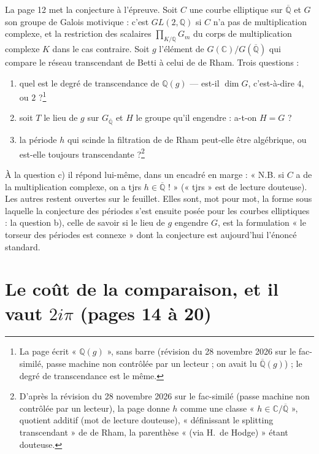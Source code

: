 \documentclass[11pt,a4paper]{article}
\begin{document}
La page 12 met la conjecture à l'épreuve. Soit $C$ une courbe elliptique sur
$\overline{\mathbb{Q}}$ et $G$ son groupe de Galois motivique : c'est
$GL(2,\mathbb{Q})$ si $C$ n'a pas de multiplication complexe, et la restriction
des scalaires $\prod_{K/\mathbb{Q}} G_{m}$ du corps de multiplication complexe
$K$ dans le cas contraire. Soit $g$ l'élément de
$G(\mathbb{C})/G(\overline{\mathbb{Q}})$ qui compare le réseau transcendant de
Betti à celui de de Rham. Trois questions :

\begin{enumerate}
  \item[a)] quel est le degré de transcendance de $\mathbb{Q}(g)$ —
        est-il $\dim G$, c'est-à-dire $4$, ou $2$ ?\footnote{La page écrit
        « $\mathbb{Q}(g)$ », sans barre (révision du 28 novembre 2026 sur le
        fac-similé, passe machine non contrôlée par un lecteur ; on avait lu
        $\overline{\mathbb{Q}}(g)$) ; le degré de transcendance est le même.}
  \item[b)] soit $T$ le lieu de $g$ sur $G_{\overline{\mathbb{Q}}}$ et $H$ le
        groupe qu'il engendre : a-t-on $H = G$ ?
  \item[c)] la période $h$ qui scinde la filtration de de Rham peut-elle être
        algébrique, ou est-elle toujours transcendante ?\footnote{D'après la
        révision du 28 novembre 2026 sur le fac-similé (passe machine non
        contrôlée par un lecteur), la page donne $h$ comme une classe
        « $h \in \mathbb{C}/\overline{\mathbb{Q}}$ », quotient additif (mot
        de lecture douteuse), « définissant le splitting transcendant » de
        de Rham, la parenthèse « (via H.\ de Hodge) » étant douteuse.}
\end{enumerate}

À la question c) il répond lui-même, dans un encadré en marge : « N.B. si $C$ a de la
multiplication complexe, on a tjrs $h \in \overline{\mathbb{Q}}$ ! » (« tjrs »
est de lecture douteuse). Les autres
restent ouvertes sur le feuillet. Elles sont, mot pour mot, la forme sous
laquelle la conjecture des périodes s'est ensuite posée pour les courbes
elliptiques : la question b), celle de savoir si le lieu de $g$ engendre $G$,
est la formulation « le torseur des périodes est connexe » dont la conjecture
est aujourd'hui l'énoncé standard.

\section*{Le coût de la comparaison, et il vaut $2i\pi$ (pages 14 à 20)}
\end{document}
